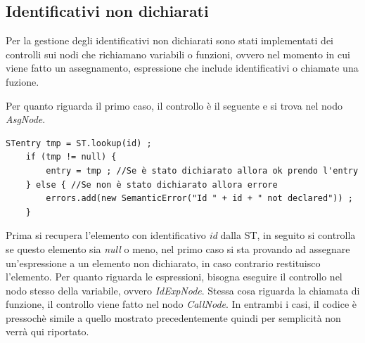 \subsection{Identificativi non dichiarati}
Per la gestione degli identificativi non dichiarati sono stati implementati dei controlli sui nodi che richiamano variabili o funzioni, ovvero nel momento in cui viene fatto un assegnamento, espressione che include identificativi o chiamate una fuzione.

Per quanto riguarda il primo caso, il controllo è il seguente e si trova nel nodo \textit{AsgNode}. 
\begin{verbatim}
STentry tmp = ST.lookup(id) ;
    if (tmp != null) {
        entry = tmp ; //Se è stato dichiarato allora ok prendo l'entry
    } else { //Se non è stato dichiarato allora errore
        errors.add(new SemanticError("Id " + id + " not declared")) ;
    }
\end{verbatim}
Prima si recupera l'elemento con identificativo \textit{id} dalla ST, in seguito si controlla se questo elemento sia \textit{null} o meno, nel primo caso si sta provando ad assegnare un'espressione a un elemento non dichiarato, in caso contrario restituisco l'elemento.
Per quanto riguarda le espressioni, bisogna eseguire il controllo nel nodo stesso della variabile, ovvero \textit{IdExpNode}. 
Stessa cosa riguarda la chiamata di funzione, il controllo viene fatto nel nodo \textit{CallNode}. In entrambi i casi, il codice è pressochè simile a quello mostrato precedentemente quindi per semplicità non verrà qui riportato.








